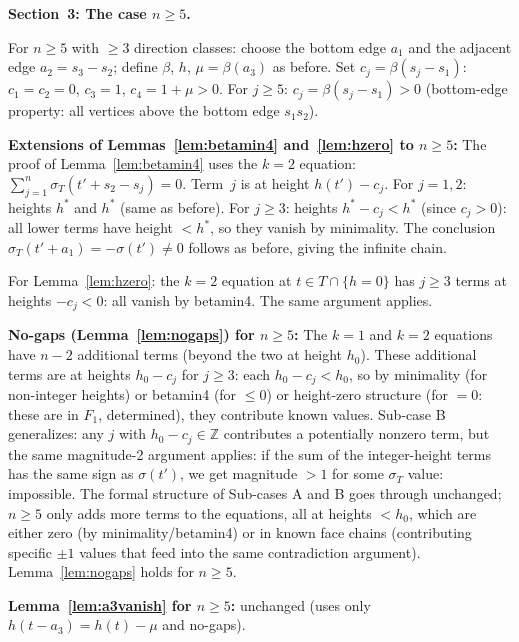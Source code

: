 \documentclass{article}
\begin{document}
\bigskip
\noindent\textbf{Section~3: The case $n\ge 5$.}

For $n\ge 5$ with $\ge 3$ direction classes: choose the bottom edge $a_1$ and
the adjacent edge $a_2=s_3-s_2$; define $\beta$, $h$, $\mu=\beta(a_3)$ as before.
Set $c_j=\beta(s_j-s_1)$: $c_1=c_2=0$, $c_3=1$, $c_4=1+\mu>0$.
For $j\ge 5$: $c_j=\beta(s_j-s_1)>0$ (bottom-edge property: all vertices above the bottom edge $s_1s_2$).

\textbf{Extensions of Lemmas~\ref{lem:betamin4} and~\ref{lem:hzero} to $n\ge 5$:}
The proof of Lemma~\ref{lem:betamin4} uses the $k=2$ equation:
$\sum_{j=1}^n\sigma_T(t'+s_2-s_j)=0$.  Term~$j$ is at height $h(t')-c_j$.
For $j=1,2$: heights $h^*$ and $h^*$ (same as before).
For $j\ge 3$: heights $h^*-c_j<h^*$ (since $c_j>0$): all lower terms have height $<h^*$,
so they vanish by minimality.  The conclusion $\sigma_T(t'+a_1)=-\sigma(t')\ne 0$ follows as before,
giving the infinite chain.  \checkmark

For Lemma~\ref{lem:hzero}: the $k=2$ equation at $t\in T\cap\{h=0\}$ has $j\ge 3$ terms at heights $-c_j<0$: all vanish by betamin4.  The same argument applies. \checkmark

\textbf{No-gaps (Lemma~\ref{lem:nogaps}) for $n\ge 5$:}
The $k=1$ and $k=2$ equations have $n-2$ additional terms (beyond the two at height $h_0$).
These additional terms are at heights $h_0-c_j$ for $j\ge 3$:
each $h_0-c_j<h_0$, so by minimality (for non-integer heights) or betamin4 (for $\le 0$)
or height-zero structure (for $=0$: these are in $F_1$, determined), they contribute
known values.  Sub-case B generalizes: any $j$ with $h_0-c_j\in\mathbb{Z}$ contributes
a potentially nonzero term, but the same magnitude-2 argument applies:
if the sum of the integer-height terms has the same sign as $\sigma(t')$,
we get magnitude $>1$ for some $\sigma_T$ value: impossible.
The formal structure of Sub-cases A and B goes through unchanged; $n\ge 5$ only
adds more terms to the equations, all at heights $<h_0$, which are either zero
(by minimality/betamin4) or in known face chains (contributing specific $\pm 1$ values
that feed into the same contradiction argument).
Lemma~\ref{lem:nogaps} holds for $n\ge 5$. \checkmark

\textbf{Lemma~\ref{lem:a3vanish} for $n\ge 5$:} unchanged (uses only $h(t-a_3)=h(t)-\mu$ and no-gaps). \checkmark
\end{document}
